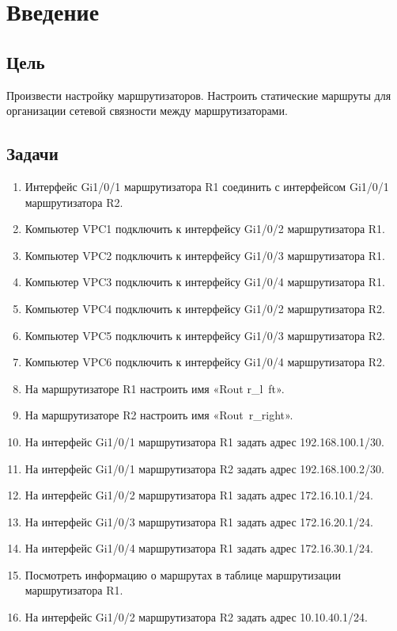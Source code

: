 \chapter{Введение}

\section{Цель}  

Произвести настройку маршрутизаторов. Настроить
статические маршруты для организации сетевой связности между
маршрутизаторами.
\section{Задачи}

\begin{enumerate}
\item Интерфейс Gi1/0/1 маршрутизатора R1 соединить с интерфейсом Gi1/0/1
маршрутизатора R2.
\item Компьютер VPC1 подключить к интерфейсу Gi1/0/2 маршрутизатора R1.
\item Компьютер VPC2 подключить к интерфейсу Gi1/0/3 маршрутизатора R1.
\item Компьютер VPC3 подключить к интерфейсу Gi1/0/4 маршрутизатора R1.
\item Компьютер VPC4 подключить к интерфейсу Gi1/0/2 маршрутизатора R2.
\item Компьютер VPC5 подключить к интерфейсу Gi1/0/3 маршрутизатора R2.
\item Компьютер VPC6 подключить к интерфейсу Gi1/0/4 маршрутизатора R2.
\item На маршрутизаторе R1 настроить имя «Rout r\_l\ ft».
\item На маршрутизаторе R2 настроить имя «Rout\ r\_right».
\item На интерфейс Gi1/0/1 маршрутизатора R1 задать адрес 192.168.100.1/30.
\item На интерфейс Gi1/0/1 маршрутизатора R2 задать адрес 192.168.100.2/30.
\item На интерфейс Gi1/0/2 маршрутизатора R1 задать адрес 172.16.10.1/24.
\item На интерфейс Gi1/0/3 маршрутизатора R1 задать адрес 172.16.20.1/24.
\item На интерфейс Gi1/0/4 маршрутизатора R1 задать адрес 172.16.30.1/24.
\item Посмотреть информацию о маршрутах в таблице маршрутизации
маршрутизатора R1.
\item На интерфейс Gi1/0/2 маршрутизатора R2 задать адрес 10.10.40.1/24.

\end{enumerate}

